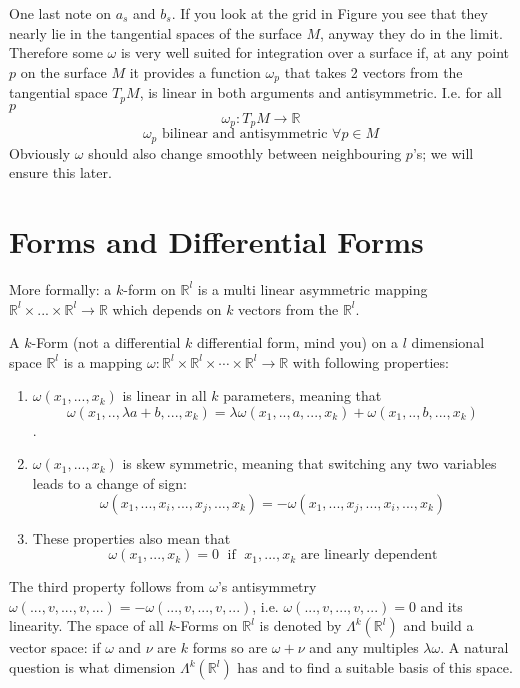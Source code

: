 One last note on $a_s$ and $b_s$. If you look at the grid in Figure  you see that they nearly lie in the tangential spaces of the surface $M$, anyway they do in the limit. Therefore some $\omega$ is very well suited for integration over a surface if, at any point $p$ on the surface $M$ it provides a function $\omega_p$ that takes 2 vectors from the tangential space $T_pM$, is linear in both arguments and antisymmetric. I.e. for all $p$
\[\omega_p: T_p M \to \mathbb R\]
\[\omega_p \text{ bilinear and antisymmetric } \forall p \in M\]
Obviously $\omega$ should also  change smoothly between neighbouring $p$'s; we will ensure this later.


\section{Forms and Differential Forms}
More formally: a $k$-form on $\mathbb R^l$ is a multi linear asymmetric mapping $\mathbb R^l \times ... \times \mathbb R^l \to \mathbb R$ which depends on $k$ vectors from the $\mathbb R^l$. 
\begin{definition}[$k$ Form]
 A $k$-Form (not a differential $k$ differential form, mind you) on a $l$ dimensional space $\mathbb R^l$ is a mapping $\omega : \mathbb R^l \times \mathbb R^l\times \cdots \times  \mathbb R^l \rightarrow \mathbb R$ with following properties:
\begin{enumerate}
\item $\omega(x_1,...,x_k)$ is linear in all $k$ parameters, meaning that \[\omega(x_1,..,\lambda a + b,..., x_k) = \lambda \omega(x_1,..,a,..., x_k) + \omega(x_1,.., b,..., x_k)\].
\item $\omega(x_1,...,x_k)$ is skew symmetric, meaning that switching any two variables leads to a change of sign:
\[\omega(x_1,...,x_i,...,x_j,...,x_k) = - \omega(x_1,...,x_j,...,x_i,...,x_k)\]
\item These properties also mean that 
\[\omega(x_1,...,x_k) = 0 \;\text{ if }\;x_1,...,x_k \text{ are linearly dependent}\]
\end{enumerate}
\end{definition}

The third property follows from $\omega$'s antisymmetry $\omega(...,v,...,v,...) = -\omega(...,v,...,v,...)$, i.e. $\omega(...,v,...,v,...) = 0$ and its
 linearity.  
The space of all $k$-Forms on $\mathbb R^l$ is denoted by $\Lambda^k (\mathbb R^l)$ and build a vector space: if $\omega$ and $\nu$ are $k$ forms so are $\omega + \nu$ and any multiples $\lambda \omega$. A natural question is what dimension $\Lambda^k(\mathbb R^l)$ has and to find a suitable basis of this space.

